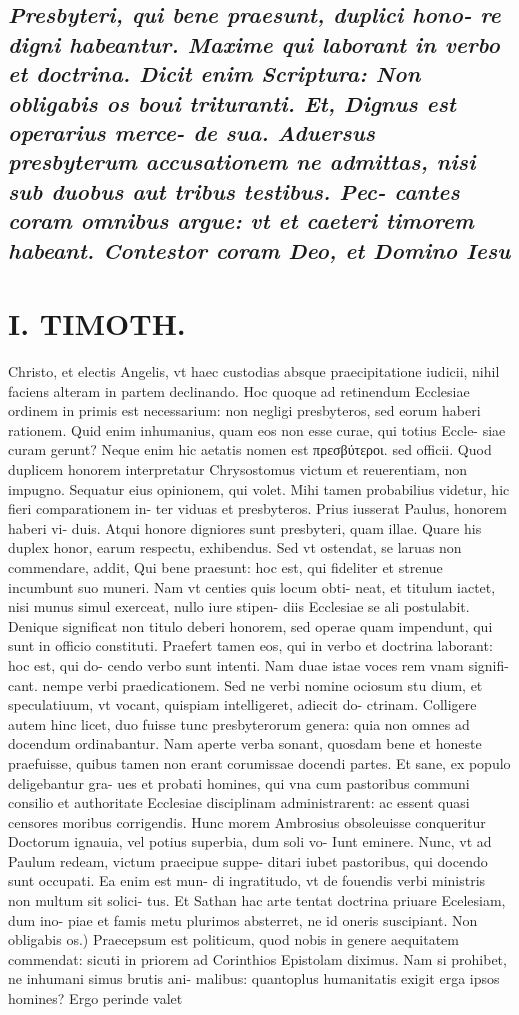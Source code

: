 \documentclass{article}
\begin{document}
\begin{pages}
\subsection*{\textit{Presbyteri, qui bene praesunt, duplici hono- re digni habeantur. Maxime qui laborant in verbo et doctrina. Dicit enim Scriptura: Non obligabis os boui trituranti. Et, Dignus est operarius merce- de sua. Aduersus presbyterum accusationem ne admittas, nisi sub duobus aut tribus testibus. Pec- cantes coram omnibus argue: vt et caeteri timorem habeant. Contestor coram Deo, et Domino Iesu }}
\section*{I. TIMOTH. }
\marginpar{[ p.66 ]}\pstart Christo, et electis Angelis, vt haec custodias absque praecipitatione iudicii, nihil faciens alteram in partem declinando.  \pend\pstart Hoc quoque ad retinendum Ecclesiae ordinem in primis est necessarium: non negligi presbyteros, sed eorum haberi rationem. Quid enim inhumanius, quam eos non esse curae, qui totius Eccle- siae curam gerunt? Neque enim hic aetatis nomen est πρεσβύτεροι. sed officii. Quod duplicem honorem interpretatur Chrysostomus victum et reuerentiam, non impugno. Sequatur eius opinionem, qui volet. Mihi tamen probabilius videtur, hic fieri comparationem in- ter viduas et presbyteros. Prius iusserat Paulus, honorem haberi vi- duis. Atqui honore digniores sunt presbyteri, quam illae. Quare his duplex honor, earum respectu, exhibendus. Sed vt ostendat, se laruas non commendare, addit, Qui bene praesunt: hoc est, qui fideliter et strenue incumbunt suo muneri. Nam vt centies quis locum obti- neat, et titulum iactet, nisi munus simul exerceat, nullo iure stipen- diis Ecclesiae se ali postulabit. Denique significat non titulo deberi honorem, sed operae quam impendunt, qui sunt in officio constituti. Praefert tamen eos, qui in verbo et doctrina laborant: hoc est, qui do- cendo verbo sunt intenti. Nam duae istae voces rem vnam signifi- cant. nempe verbi praedicationem. Sed ne verbi nomine ociosum stu dium, et speculatiuum, vt vocant, quispiam intelligeret, adiecit do- ctrinam. Colligere autem hinc licet, duo fuisse tunc presbyterorum genera: quia non omnes ad docendum ordinabantur. Nam aperte verba sonant, quosdam bene et honeste praefuisse, quibus tamen non erant corumissae docendi partes. Et sane, ex populo deligebantur gra- ues et probati homines, qui vna cum pastoribus communi consilio et authoritate Ecclesiae disciplinam administrarent: ac essent quasi censores moribus corrigendis. Hunc morem Ambrosius obsoleuisse conqueritur Doctorum ignauia, vel potius superbia, dum soli vo- Iunt eminere. Nunc, vt ad Paulum redeam, victum praecipue suppe- ditari iubet pastoribus, qui docendo sunt occupati. Ea enim est mun- di ingratitudo, vt de fouendis verbi ministris non multum sit solici- tus. Et Sathan hac arte tentat doctrina priuare Ecelesiam, dum ino- piae et famis metu plurimos absterret, ne id oneris suscipiant.  \pend\pstart Non obligabis os.) Praecepsum est politicum, quod nobis in genere aequitatem commendat: sicuti in priorem ad Corinthios Epistolam diximus. Nam si prohibet, ne inhumani simus brutis ani- malibus: quantoplus humanitatis exigit erga ipsos homines? Ergo perinde valet 
\end{pages}
\end{document}
